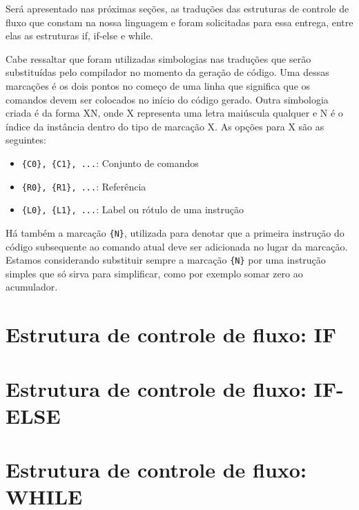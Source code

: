 
Será apresentado nas próximas seções, as traduções das estruturas de controle de fluxo que constam na nossa linguagem e foram solicitadas para essa entrega, entre elas as estruturas if, if-else e while.

Cabe ressaltar que foram utilizadas simbologias nas traduções que serão substituídas pelo compilador no momento da geração de código. Uma dessas marcações é os dois pontos no começo de uma linha que significa que os comandos devem ser colocados no início do código gerado. Outra simbologia criada é da forma {XN}, onde X representa uma letra maiúscula qualquer e N é o índice da instância dentro do tipo de marcação X. As opções para X são as seguintes:

\begin{itemize}
	\item \verb={C0}, {C1}, ...=: Conjunto de comandos
	\item \verb={R0}, {R1}, ...=: Referência
	\item \verb={L0}, {L1}, ...=: Label ou rótulo de uma instrução
\end{itemize}

Há também a marcação \verb={N}=, utilizada para denotar que a primeira instrução do código subsequente ao comando atual deve ser adicionada no lugar da marcação. Estamos considerando substituir sempre a marcação \verb={N}= por uma instrução simples que só sirva para simplificar, como por exemplo somar zero ao acumulador.

\section{Estrutura de controle de fluxo: IF}
\label{sec:if}



\section{Estrutura de controle de fluxo: IF-ELSE}
\label{sec:if-else}



\section{Estrutura de controle de fluxo: WHILE}
\label{sec:while}



